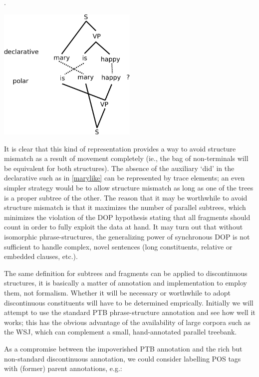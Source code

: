 \documentclass[a4paper]{article}
\theoremstyle{definition}
\begin{document}
\ex. \label{marydiscont}

\begin{center}
\includegraphics[width=0.5\textwidth]{maryishappy-crop.pdf}
\end{center}
\vspace{1em}

It is clear that this kind of representation provides a way to avoid structure
mismatch as a result of movement completely (ie., the bag of non-terminals will
be equivalent for both structures). The absence of the auxiliary `did' in the
declarative such as in \ref{marylike} can be represented by trace elements; an
even simpler strategy would be to allow structure mismatch as long as one of
the trees is a proper subtree of the other. The reason that it may be
worthwhile to avoid structure mismatch is that it maximizes the number of
parallel subtrees, which minimizes the violation of the DOP hypothesis stating
that all fragments should count in order to fully exploit the data at hand. It
may turn out that without isomorphic phrase-structures, the generalizing power
of synchronous DOP is not sufficient to handle complex, novel sentences (long
constituents, relative or embedded clauses, etc.).

The same definition for subtrees and fragments can be applied to discontinuous
structures, it is basically a matter of annotation and implementation to employ
them, not formalism.  Whether it will be necessary or worthwhile to adopt
discontinuous constituents will have to be determined emprically. Initially we
will attempt to use the standard PTB phrase-structure annotation and see how well
it works; this has the obvious advantage of the availability of large corpora such
as the WSJ, which can complement a small, hand-annotated parallel treebank.


As a compromise between the impoverished PTB annotation and the rich but non-standard
discontinuous annotation, we could consider labelling POS tags with (former) parent
annotations, e.g.:
\end{document}
